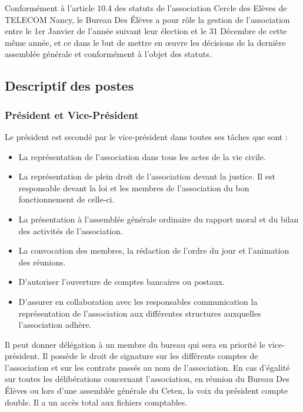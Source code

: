 \documentclass{article} %
\begin{document}
			Conformément à l’article 10.4 des statuts de l’association Cercle
			des Elèves de TELECOM Nancy, le Bureau Des Élèves a pour rôle la
			gestion de l'association entre le 1er Janvier de l’année suivant
			leur élection et le 31 Décembre de cette même année, et ce dans le
			but de mettre en œuvre les décisions de la dernière assemblée
			générale et conformément à l'objet des statuts.

		\subsection{Descriptif des postes}

			\subsubsection{Président et Vice-Président}

				Le président est secondé par le vice-président dans toutes ses
				tâches que sont :
				\begin{itemize}
					\item La représentation de l’association dans tous les actes
						de la vie civile.
					\item La représentation de plein droit de l’association
						devant la justice. Il est responsable devant la loi et
						les membres de l’association du bon fonctionnement de
						celle-ci.
					\item La présentation à l’assemblée générale
						ordinaire du rapport moral et du bilan des activités de
						l’association.
					\item La convocation des membres, la rédaction de l’ordre du
						jour et l’animation des réunions.
					\item D’autoriser l’ouverture de comptes bancaires ou
						postaux.
					\item D’assurer en collaboration avec les responsables
						communication la représentation de l’association aux
						différentes structures auxquelles l’association adhère. 
				\end{itemize}

				Il peut donner délégation à un membre du bureau qui sera en
				priorité le vice-président. Il possède le droit de signature sur
				les différents comptes de l'association et sur les contrats
				passés au nom de l’association. En cas d’égalité sur toutes les
				délibérations concernant l’association, en réunion du Bureau Des
				Élèves ou lors d’une assemblée générale du Ceten, la voix du
				président compte double. Il a un accès total aux fichiers
				comptables.
\end{document}
